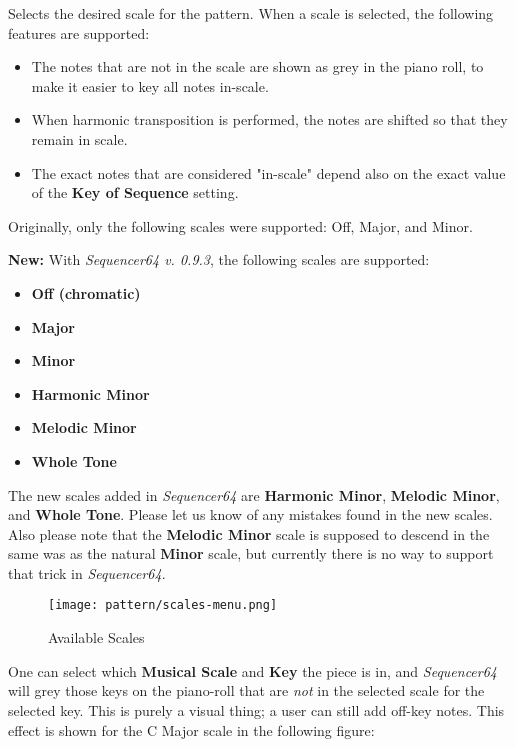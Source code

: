    Selects the desired scale for the pattern.
   When a scale is selected, the following features are supported:

   \begin{itemize}
      \item The notes that are not in the scale are shown as grey in the piano
         roll, to make it easier to key all notes in-scale.
      \item When harmonic transposition is performed, the notes are shifted
         so that they remain in scale.
      \item The exact notes that are considered "in-scale" depend also on the 
         exact value of the \textbf{Key of Sequence} setting.
   \end{itemize}

   Originally, only the following scales were supported: Off, Major, and Minor.

   \textbf{New:}
   With \textsl{Sequencer64 v. 0.9.3}, the following scales are supported:

   \begin{itemize}
      \item \textbf{Off (chromatic)}
      \item \textbf{Major}
      \item \textbf{Minor}
      \item \textbf{Harmonic Minor}
      \item \textbf{Melodic Minor}
      \item \textbf{Whole Tone}
   \end{itemize}

   The new scales added in \textsl{Sequencer64} are
   \textbf{Harmonic Minor}, \textbf{Melodic Minor}, and \textbf{Whole Tone}.
   Please let us know of any mistakes found in the new scales.
   Also please note that the \textbf{Melodic Minor} scale is supposed to
   descend in the same was as the natural \textbf{Minor} scale, but
   currently there is no way to support that trick in
   \textsl{Sequencer64}.

\begin{figure}[H]
   \centering 
   \texttt{[image: pattern/scales-menu.png]}
   \caption{Available Scales}
   \label{fig:pattern_editor_available_scales}
\end{figure}

   One can select which \textbf{Musical Scale} and
   \textbf{Key} the piece is in,
   and \textsl{Sequencer64} will grey those keys on the piano-roll that
   are \textsl{not} in the selected scale for the selected key.
   This is purely a visual thing; a user can still add off-key notes.
   This effect is shown for the C Major scale in the following figure:

